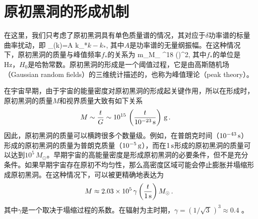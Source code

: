 
\section{原初黑洞的形成机制}

在这里，我们只考虑了原初黑洞具有单色质量谱的情况，其对应于$\delta$功率谱的标量曲率扰动，即
\e\label{pzeta1}
_{\zeta}(k)=A k_*\delta\(k-k_*\),
\q
其中$A$是功率谱的无量纲振幅。在这种情况下，原初黑洞的质量与峰值频率$f_*$的关系为\cite{Hawking:1971ei,Carr:1974nx}
\m\label{mkrelation}
{m_{}\over M_{\odot}} ^{18}%
\left(\right)^{2},
\n
其中$f_*$的单位是Hz，$H_0$是哈勃常数。原初黑洞的形成是一个阈值过程，它是由高斯随机场（Gaussian random fields）的三维统计描述的，也称为峰值理论（peak theory）\cite{Bardeen:1985tr}。

在宇宙早期，由于宇宙的能量密度对原初黑洞的形成起关键作用\cite{Hawking:1971ei, Carr:1974nx}，所以在形成时，原初黑洞的质量$M$和视界质量大致有如下关系
\begin{align}
    M
    &\sim
    \frac{ t }{ G }
    \sim
    10^{15}\,
    \left(
    \frac{t}{10^{-23}\,\mathrm{s}}
    \right)\,
    \mathrm{g}
    \, .
    \label{eq:Moft}
\end{align}
因此，原初黑洞的质量可以横跨很多个数量级。例如，在普朗克时间（$10^{-43}\,\mathrm{s}$）形成的原初黑洞的质量为普朗克质量（$10^{-5}\,\mathrm{g}$），而在$1\,\mathrm{s}$形成的原初黑洞的质量可以达到$10^{5}\, M_{\odot}$。早期宇宙的高能量密度是形成原初黑洞的必要条件，但不是充分条件。如果早期宇宙存在原初不均匀性，那么高密度区域可能会停止膨胀并塌缩形成原初黑洞。在这种情况下，可以被更精确地表达为\cite{Carr:2009jm}
\begin{equation}
    M
    \approx
    2.03 \times 10^{5}\,
    \gamma
    \left( \frac{t}{1\,\mathrm{s}} \right)
    M_{\odot}
    \, .
    \label{mass}
\end{equation}
其中$\gamma$是一个取决于塌缩过程的系数。在辐射为主时期，$\gamma = (1 / \sqrt{3\,})^{3} \approx 0.4$ \cite{Green:2004wb}。


